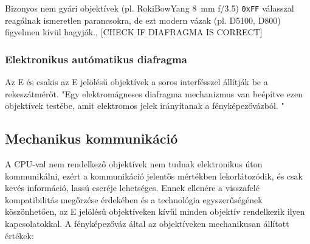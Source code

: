 Bizonyos nem gyári objektívek (pl. RokiBowYang 8~mm f/3.5) \texttt{0xFF} 
válasszal reagálnak ismeretlen parancsokra, de ezt modern vázak (pl. D5100, 
D800) figyelmen kívül hagyják.\cite{nikonhacker_fmount}, \cite{lainy_nikonlens_issue1}
[CHECK IF DIAFRAGMA IS CORRECT]

\subsubsection{Elektronikus autómatikus diafragma}
Az E és csakis az E jelölésű objektívek a soros interfésszel állítják be a rekeszátmérőt.
"Egy elektromágneses diafragma mechanizmus van beépítve ezen objektívek testébe, amit elektromos jelek irányítanak a fényképezővázból. "\cite{Lens_naming}

\subsection{Mechanikus kommunikáció}
A CPU-val nem rendelkező objektívek nem tudnak elektronikus úton kommunikálni, ezért a kommunikáció jelentős mértékben lekorlátozódik, és csak kevés információ, lassú cseréje lehetséges.
Ennek ellenére a visszafelé kompatibilitás megőrzése érdekében és a technológia egyszerűségének köszönhetően, az E jelölésű objektíveken kívűl minden objektív rendelkezik ilyen kapcsolatokkal.
A fényképezőváz által az objektíveken mechanikusan állított értékek:
